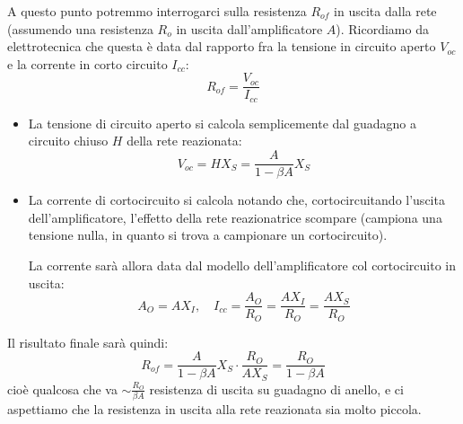 \documentclass[a4paper,11pt]{article}
\begin{document}
A questo punto potremmo interrogarci sulla resistenza $R_{of}$ in uscita dalla rete (assumendo una resistenza $R_o$ in uscita dall'amplificatore $A$). Ricordiamo da elettrotecnica che questa è data dal rapporto fra la tensione in circuito aperto $V_{oc}$ e la corrente in corto circuito $I_{cc}$:
$$
R_{of} = \frac{V_{oc}}{I_{cc}}
$$
\begin{itemize}
	\item La tensione di circuito aperto si calcola semplicemente dal guadagno a circuito chiuso $H$ della rete reazionata:
		$$
			V_{oc} = H X_S = \frac{A}{1 - \beta A} X_S
		$$
	\item La corrente di cortocircuito si calcola notando che, cortocircuitando l'uscita dell'amplificatore, l'effetto della rete reazionatrice scompare (campiona una tensione nulla, in quanto si trova a campionare un cortocircuito). 

		La corrente sarà allora data dal modello dell'amplificatore col cortocircuito in uscita:
		$$
			A_O = A X_I, \quad I_{cc} = \frac{A_O}{R_O} = \frac{A X_I}{R_O} = \frac{A X_S}{R_O}
		$$
\end{itemize}
Il risultato finale sarà quindi:
$$
R_{of} = \frac{A}{1 - \beta A}{X_S} \cdot \frac{R_O}{A X_S} = \frac{R_O}{1 - \beta A}
$$
cioè qualcosa che va $\sim \frac{R_O}{\beta A}$ resistenza di uscita su guadagno di anello, e ci aspettiamo che la resistenza in uscita alla rete reazionata sia molto piccola.
\end{document}
